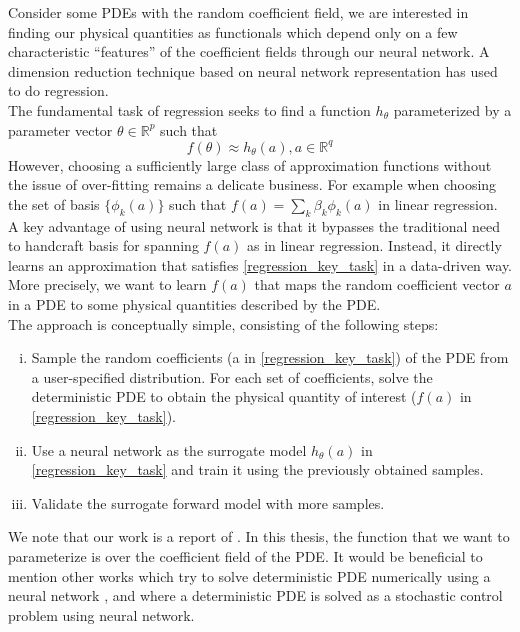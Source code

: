 Consider some PDEs with the random coefficient field, we are interested in finding our physical quantities as functionals which depend only on a few characteristic ``features'' of the coefficient fields through our neural network. A dimension reduction technique based on neural network representation has used to do regression.\\
The fundamental task of regression seeks to find a function $h_{\theta}$ parameterized by a parameter vector $\theta \in \mathbb{R}^{p}$ such that
\begin{equation}
f(\theta) \approx h_{\theta}(a), a\in \mathbb{R}^{q}
\label{regression_key_task}
\end{equation}
However, choosing a sufficiently large class of approximation functions without the issue of over-fitting remains a delicate business. For example when choosing the set of basis $\{\phi_k(a)\}$ such that $f(a) = \sum_{k} \beta_k \phi_k(a)$ in linear regression.\\ 
A key advantage of using neural network is that it bypasses the traditional need to handcraft basis for spanning $f(a)$ as in linear regression. Instead, it directly learns an approximation that satisfies \eqref{regression_key_task} in a data-driven way.
More precisely, we want to learn $f(a)$ that maps the random coefficient vector $a$ in a PDE to some physical quantities described by the PDE.\\
The approach is conceptually simple, consisting of the following steps:
\begin{enumerate}[i.]
	\item Sample the random coefficients (a in \eqref{regression_key_task}) of the PDE from a user-specified distribution. For each set of coefficients, solve the deterministic PDE to obtain the physical quantity of interest ($f(a)$ in \eqref{regression_key_task}).
	\item Use a neural network as the surrogate model $h_{\theta}(a)$ in \eqref{regression_key_task} and train it using the previously obtained samples.
	\item  Validate the surrogate forward model with more samples. 
\end{enumerate}

We note that our work is a report of \cite{Base_paper}. In this thesis, the function that we want to parameterize is over the coefficient field of the PDE. 
It would be beneficial to mention other works which try to solve deterministic PDE numerically using a neural network \cite{weinan2018deep, khoo2019solving, lagaris1998artificial, long2017pde, rudd2015constrained}, and \cite{han2018solving} where a deterministic PDE is solved as a stochastic control problem using neural network. \\


